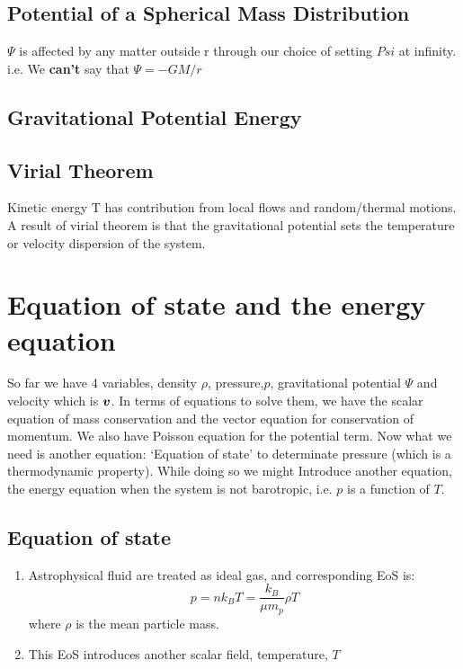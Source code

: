 \documentclass[12pt,a4paper]{article}
\begin{document}
\subsection{Potential of a Spherical Mass Distribution}
$\Psi$ is affected by any matter outside r through our choice of setting $Psi$ at infinity. 
i.e. We \textbf{can't} say that $\Psi = -GM/r$

\subsection{Gravitational Potential Energy}
\subsection{Virial Theorem}
Kinetic energy T has contribution from local flows and random/thermal motions.\\
A result of virial theorem is that the gravitational potential sets the temperature or velocity dispersion of the system.
\section{Equation of state and the energy equation}
So far we have 4 variables, density $\rho$, pressure,$p$, gravitational potential $\Psi$ and velocity which is $\vb*{v}$.
In terms of equations to solve them, we have the scalar equation of mass conservation and the vector equation for conservation of momentum. We also have Poisson equation for the potential term.
Now what we need is another equation: `Equation of state' to determinate pressure (which is a thermodynamic property). While doing so we might Introduce another equation, the energy equation when the system is not barotropic, i.e. $p$ is a function of $T$.
\subsection{Equation of state}
    \begin{enumerate}
        \item Astrophysical fluid are treated as ideal gas, and corresponding EoS is:
        \begin{equation}
            p=nk_B T =\frac{k_B}{\mu m_p}\rho T
        \end{equation}
        where $\rho$ is the mean particle mass.
        \item This EoS introduces another scalar field, temperature, $T$
    \end{enumerate}
\end{document}
